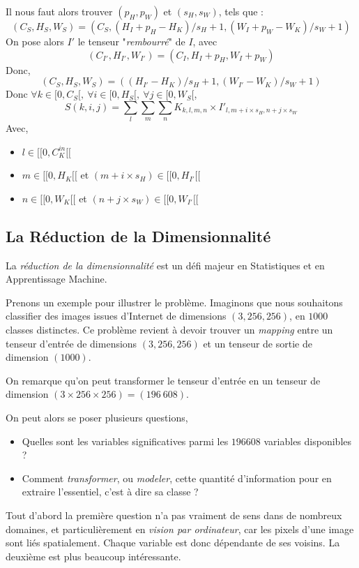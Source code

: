 \documentclass[a4paper, 11pt]{report}
\begin{document}
Il nous faut alors trouver $(p_H, p_W)$ et $(s_H, s_W)$, tels que :
$$(C_S, H_S, W_S) = (C_S, (H_I + p_H - H_K) / s_H + 1, (W_I + p_W - W_K) / s_W + 1)$$
On pose alors $I'$ le tenseur "\emph{rembourré}" de $I$, avec 
$$(C_{I'}, H_{I'}, W_{I'}) = (C_I, H_I + p_H, W_I + p_W)$$
Donc,
$$(C_S, H_S, W_S) = ((H_{I'} - H_K) / s_H + 1, (W_{I'} - W_K) / s_W + 1)$$
Donc $\forall k \in [0, C_S[, \ \forall i \in [0, H_S[, \ \forall j \in [0, W_S[$,
$$S(k, i, j) = \sum_{l}\sum_{m}\sum_{n}{K_{k, l, m, n} \times {I'}_{l, m + i \times s_H, n + j \times s_W}}$$
Avec,
\begin{itemize}
	\item $l \in [\![0, C_K^{in}[\![$
	\item $m \in [\![0, H_K[\![$ et $(m + i \times s_H) \in [\![0, H_{I'}[\![$
	\item $n \in [\![0, W_K[\![$ et $(n + j \times s_W) \in [\![0, W_{I'}[\![$
\end{itemize}
\subsection{La Réduction de la Dimensionnalité}
La \emph{réduction de la dimensionnalité} est un défi majeur en Statistiques et en Apprentissage Machine.

Prenons un exemple pour illustrer le problème.
Imaginons que nous souhaitons classifier des images issues d'Internet de dimensions $(3,256,256)$, en $1000$ classes distinctes.
Ce problème revient à devoir trouver un \emph{mapping} entre un tenseur d'entrée de dimensions $(3, 256, 256)$ et un tenseur de sortie de dimension $(1000)$.

On remarque qu'on peut transformer le tenseur d'entrée en un tenseur de dimension $(3 \times 256 \times 256) = (196\ 608)$.

On peut alors se poser plusieurs questions,
\begin{itemize}
	\item Quelles sont les variables significatives parmi les $196608$ variables disponibles ?
	\item Comment \emph{transformer}, ou \emph{modeler}, cette quantité d'information pour en extraire l'essentiel, c'est à dire sa classe ?
\end{itemize}

Tout d'abord la première question n'a pas vraiment de sens dans de nombreux domaines, et particulièrement en \emph{vision par ordinateur}, car les pixels d'une image sont liés spatialement. Chaque variable est donc dépendante de ses voisins.
La deuxième est plus beaucoup intéressante.
\end{document}
